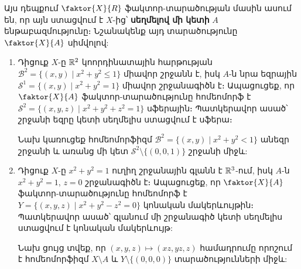 \par Այս դեպքում $\faktor{X}{R}$ ֆակտոր-տարածության մասին ասում են, որ այն ստացվում է $X$-ից՝ \textbf{սեղմելով մի կետի} $A$ ենթաբազմությունը։ Նշանակենք այդ տարածու\-թյու\-նը $\faktor{X}{A}$ սիմվոլով:

\begin{enumerate}[label=\thesection.\arabic*., resume=probset12]

\item Դիցուք $X$-ը $\mathbb{R}^2$ կոորդինատային հարթության $\mathcal{B}^2 = \{(x, y) \mid x^2+y^2 \le 1\}$ միավոր շրջանն է, իսկ $A$-ն նրա եզրային $\mathcal{S}^1 = \{(x, y) \mid x^2+y^2 = 1\}$ միավոր շրջանագիծն է։ Ապացուցեք, որ $\faktor{X}{A}$ ֆակտոր-տարածությունը հոմեոմորֆ է $\mathcal{S}^2 = \{(x, y, z) \mid x^2+y^2+z^2=1\}$ սֆերային։
Պատկերավոր ասած՝ շրջանի եզրը կետի սեղմելիս ստացվում է սֆերա։

\begin{hint}
Նախ կառուցեք հոմեոմորֆիզմ $\mathcal{B}^2 = \{(x, y) \mid x^2+y^2 < 1\}$ ան\-եզր շրջանի և առանց մի կետ $\mathcal{S}^2 \setminus \{(0, 0, 1)\}$ շրջանի միջև:
\end{hint}

\item Դիցուք $X$-ը $x^2+y^2=1$ ուղիղ շրջանային գլանն է $\mathbb{R}^3$-ում, իսկ $A$-ն $x^2+y^2=1$, $z=0$ շրջանագիծն է։ Ապացուցեք, որ $\faktor{X}{A}$ ֆակտոր-տարածությունը հոմեոմորֆ է $Y = \{(x, y, z) \mid x^2+y^2-z^2=0\}$ կոնական մակերևույթին։ Պատ\-կե\-րա\-վոր ասած՝ գլանում մի շրջանագիծ կետի սեղմելիս ստացվում է կոնական մակ\-երևույթ:

\begin{hint}
Նախ ցույց տվեք, որ $(x, y, z) \mapsto (xz, yz, z)$ համադրումը որոշում է հոմեոմորֆիզմ $X \setminus A$ և $Y \setminus \{(0, 0, 0)\}$ տարածությունների միջև:
\end{hint}

\end{enumerate}
